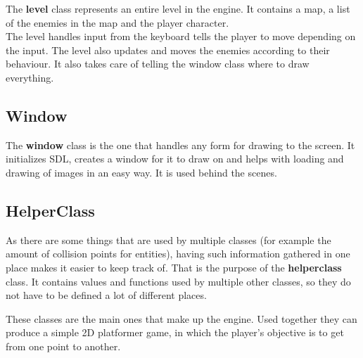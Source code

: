 The \textbf{level} class represents an entire level in the engine. It contains a map, a list of the enemies in the map and the player character. 
\\The level handles input from the keyboard tells the player to move depending on the input. The level also updates and moves the enemies according to their behaviour. It also takes care of telling the window class where to draw everything.

\subsection*{Window}
\label{03_01_05}

The \textbf{window} class is the one that handles any form for drawing to the screen. It initializes SDL, creates a window for it to draw on and helps with loading and drawing of images in an easy way. It is used behind the scenes.

\subsection*{HelperClass}
\label{03_01_06}

As there are some things that are used by multiple classes (for example the amount of collision points for entities), having such information gathered in one place makes it easier to keep track of. That is the purpose of the \textbf{helperclass} class. It contains values and functions used by multiple other classes, so they do not have to be defined a lot of different places.

These classes are the main ones that make up the engine. Used together they can produce a simple 2D platformer game, in which the player's objective is to get from one point to another.